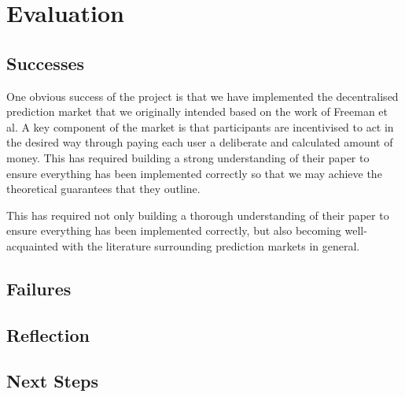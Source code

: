 \section{Evaluation}

\label{sec:evaluation}

\subsection{Successes}

One obvious success of the project is that we have implemented the
decentralised prediction market that we originally intended based on the work
of Freeman et al. A key component of the market is that participants are
incentivised to act in the desired way through paying each user a deliberate
and calculated amount of money. This has required building a strong
understanding of their paper to ensure everything has been implemented
correctly so that we may achieve the theoretical guarantees that they outline.

This has required not only building a thorough understanding
of their paper to ensure everything has been implemented correctly, but also
becoming well-acquainted with the literature surrounding prediction markets in
general. 

\subsection{Failures}

\subsection{Reflection}

\subsection{Next Steps}

